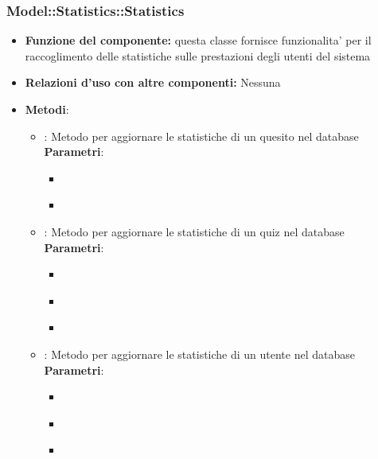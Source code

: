 \subsubsection{Model::Statistics::Statistics}
\begin{itemize}
\item\textbf{Funzione del componente:} questa classe fornisce funzionalita' per il raccoglimento delle statistiche sulle prestazioni degli utenti del sistema
\item\textbf{Relazioni d'uso con altre componenti:} Nessuna\\
\item\textbf{Metodi}:
\begin{itemize}
	\item{} : Metodo per aggiornare le statistiche di un quesito nel database\\
	\textbf{Parametri}:
	\begin{itemize}
		\item{}\\
		\item{}\\
	\end{itemize}
	\item{} : Metodo per aggiornare le statistiche di un quiz nel database\\
	\textbf{Parametri}:
	\begin{itemize}
		\item{}\\
		\item{}\\
		\item{}\\
	\end{itemize}
	\item{} : Metodo per aggiornare le statistiche di un utente nel database\\
	\textbf{Parametri}:
	\begin{itemize}
		\item{}\\
		\item{}\\
		\item{}\\
	\end{itemize}
\end{itemize}
\end{itemize}

